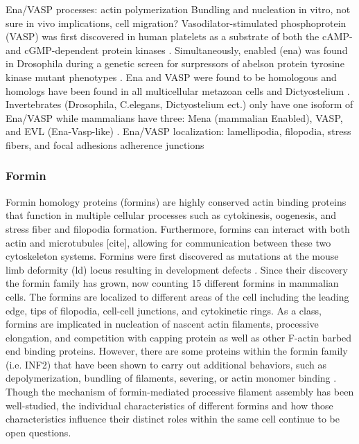 Ena/VASP processes: actin polymerization
Bundling and nucleation in vitro, not sure in vivo implications, cell migration?
Vasodilator-stimulated phosphoprotein (VASP) was first discovered in human platelets as a substrate of both the cAMP- and cGMP-dependent protein kinases \citep{halbrugge_analysis_1990}. Simultaneously, enabled (ena) was found in Drosophila during a genetic screen for surpressors of abelson protein tyrosine kinase mutant phenotypes \citep{gertler_genetic_1990}. Ena and VASP were found to be homologous \citep{ahern-djamali_identification_1999} and homologs have been found in all multicellular metazoan cells and Dictyostelium \citep{sebe-pedros_insights_2013}.
Invertebrates (Drosophila, C.elegans, Dictyostelium ect.) only have one isoform of Ena/VASP while mammalians have three: Mena (mammalian Enabled), VASP, and EVL (Ena-Vasp-like) \cite{gertler_mena_1996}.
Ena/VASP localization: lamellipodia, filopodia, stress fibers, and focal adhesions adherence junctions

\subsubsection{Formin}

Formin homology proteins (formins) are highly conserved actin binding proteins that function in multiple cellular processes such as cytokinesis, oogenesis, and stress fiber and filopodia formation. Furthermore, formins can interact with both actin and microtubules [cite], allowing for communication between these two cytoskeleton systems. Formins were first discovered as mutations at the mouse limb deformity (ld) locus resulting in development defects \citep{woychik_formins:_1990}. Since their discovery the formin family has grown, now counting 15 different formins in mammalian cells. The formins are localized to different areas of the cell including the leading edge, tips of filopodia, cell-cell junctions, and cytokinetic rings. As a class, formins are implicated in nucleation of nascent actin filaments, processive elongation, and competition with capping protein as well as other F-actin barbed end binding proteins. However, there are some proteins within the formin family (i.e. INF2) that have been shown to carry out additional behaviors, such as depolymerization, bundling of filaments, severing, or actin monomer binding \citep{gurel_assembly_2015}. Though the mechanism of formin-mediated processive filament assembly has been well-studied, the individual characteristics of different formins and how those characteristics influence their distinct roles within the same cell  continue to be open questions. 

